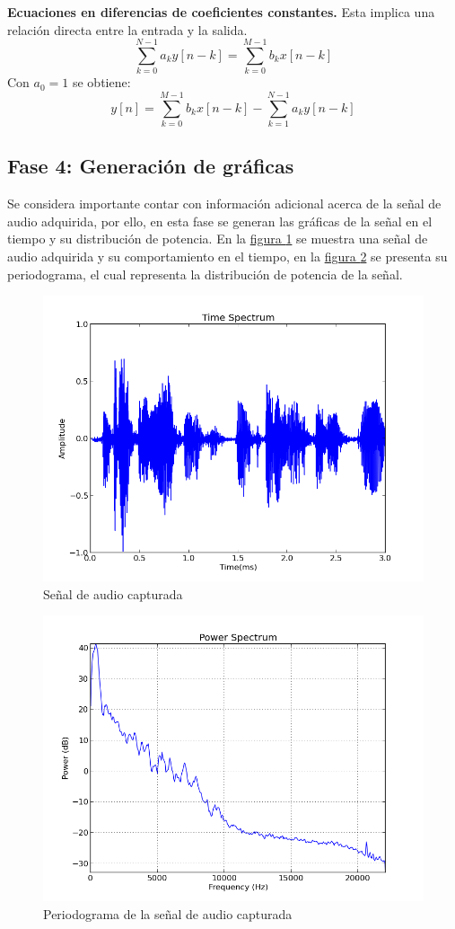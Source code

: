 \documentclass[11pt,lettersize]{article} %
\newcommand{\figura}[1]{\hyperref[{#1}]{figura \ref*{#1}}}
\begin{document}
\textbf{Ecuaciones en diferencias de coeficientes constantes.}
Esta implica una relación directa entre la entrada y la salida.
\begin{equation}
	\sum_{k=0}^{N-1} a_{k} y[n-k] = \sum_{k=0}^{M-1} b_{k} x[n-k]
\end{equation}
Con $a_{0} = 1$ se obtiene:
\begin{equation}
	y[n] = \sum_{k=0}^{M-1} b_{k} x[n-k] - \sum_{k=1}^{N-1} a_{k} y[n-k]
\end{equation}




\subsection{Fase 4: Generación de gráficas}
Se considera importante contar con información adicional acerca de la señal de audio adquirida, por ello, en esta fase se generan las gráficas de la señal en el tiempo y su distribución de potencia. En la \figura{F-tspectrum} se muestra una señal de audio adquirida y su comportamiento en el tiempo, en la \figura{F-pspectrum} se presenta su periodograma, el cual representa la distribución de potencia de la señal.
\begin{figure}[h!]
	\centering
	\includegraphics[width=.8\textwidth]{images/tspectrum.png}
	\caption{Señal de audio capturada}
	\label{F-tspectrum}
\end{figure}
\begin{figure}[h!]
	\centering
	\includegraphics[width=.8\textwidth]{images/pspectrum.png}
	\caption{Periodograma de la señal de audio capturada}
	\label{F-pspectrum}
\end{figure}
\end{document}
